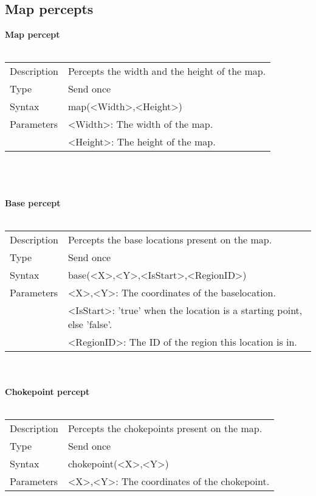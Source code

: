 \documentclass[english,11pt]{report}
\begin{document}
\subsection{Map percepts}
\textbf{Map percept}\\
\\
\begin{tabularx}{\textwidth}{lX}
 Description & Percepts the width and the height of the map. \\
 Type & Send once \\
 Syntax & map(<Width>,<Height>) \\
 Parameters &   <Width>: The width of the map.\\
            &   <Height>: The height of the map.
\end{tabularx}\\
\\
\\
\textbf{Base percept}\\
\\
\begin{tabularx}{\textwidth}{lX}
 Description & Percepts the base locations present on the map. \\
 Type & Send once \\
 Syntax & base(<X>,<Y>,<IsStart>,<RegionID>) \\
 Parameters &   <X>,<Y>: The coordinates of the baselocation.\\
            &   <IsStart>: 'true' when the location is a starting point, else 'false'.\\
            &   <RegionID>: The ID of the region this location is in.
\end{tabularx}\\
\\
\newpage
\textbf{Chokepoint percept}\\
\\
\begin{tabularx}{\textwidth}{lX}
 Description & Percepts the chokepoints present on the map. \\
 Type & Send once \\
 Syntax & chokepoint(<X>,<Y>) \\
 Parameters &   <X>,<Y>: The coordinates of the chokepoint.
\end{tabularx}\\
\\
\\
\end{document}
